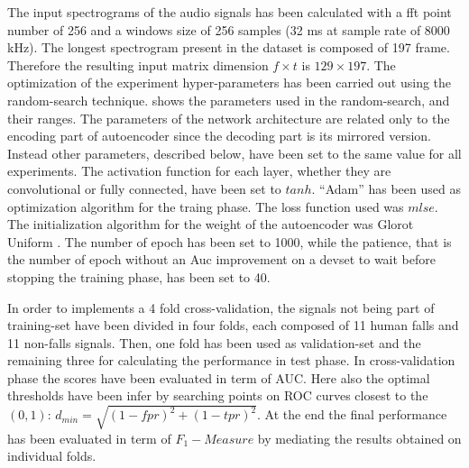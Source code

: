 The input spectrograms of the audio signals has been calculated with a fft point number of 256 and a windows size of 256 samples (32 ms at sample rate of 8000 kHz). The longest spectrogram present in the dataset is composed of 197 frame. Therefore the resulting input matrix  dimension $f\times t$ is $129\times 197$.
The optimization of the experiment hyper-parameters has been carried out using the random-search technique.  shows the parameters used in the random-search, and their ranges. The parameters of the network architecture are related only to the encoding part of autoencoder since the decoding part is its mirrored version. 
Instead other parameters, described below, have been set to the same value for all experiments. The activation function for each layer, whether they are convolutional or fully connected, have been set to $tanh$. ``Adam'' \cite{kingma2014adam} has been used as optimization algorithm for the traing phase. The loss function used was $mlse$. The initialization algorithm for the weight of the autoencoder was Glorot Uniform \cite{glorot2010understanding}. The number of epoch has been set to 1000, while the patience, that is the number of epoch without an Auc improvement on a devset to wait before stopping the training phase, has been set to 40.

In order to implements a 4 fold cross-validation, the signals not being part of training-set have been divided in four folds, each composed of 11 human falls and 11 non-falls signals. Then, one fold has been used as validation-set and the remaining three for calculating the performance in test phase. In cross-validation phase the scores have been evaluated in term of AUC. Here also the optimal thresholds have been infer by searching points on ROC curves closest to the $(0, 1)$: $ d_{min} = \sqrt{(1-fpr)^{2}+(1-tpr)^{2}} $.
At the end the final performance has been evaluated in term of  $ F_1 -Measure$ by mediating the results obtained on individual folds.

